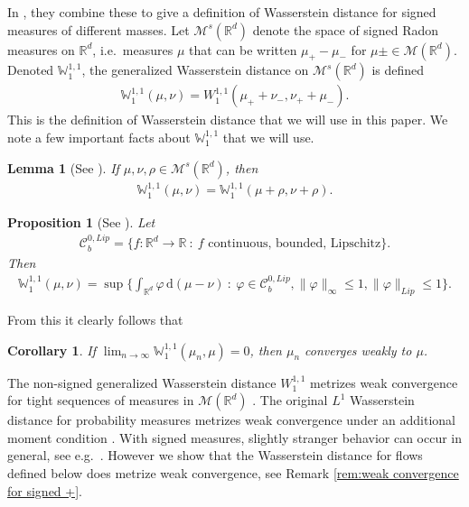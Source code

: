 \documentclass[11pt]{article}
\newtheorem{lemma}[thm]{Lemma}
\newtheorem{prop}[thm]{Proposition}
\newtheorem{cor}[thm]{Corollary}
\theoremstyle{remark}
\theoremstyle{definition}
\newcommand{\norm}[1] {\| #1\|}
\newcommand{\mc}[1]{\mathcal{#1}}
\newcommand{\m}[1]{\mathbb{#1}}
\newcommand{\dd}{\mathrm{d}}
\begin{document}
In \cite{piccoli_signed}, they combine these to give a definition of Wasserstein distance for signed measures of different masses. Let $\mc M^s(\m R^d)$ denote the space of signed Radon measures on $\m R^d$, i.e.\ measures $\mu$ that can be written $\mu_+-\mu_-$ for $\mu\pm\in \mc M(\m R^d)$. Denoted $\m W_1^{1,1}$, the generalized Wasserstein distance on $\mc M^s(\m R^d)$ is defined
\begin{align*}
    \m W_1^{1,1}(\mu,\nu) = W_1^{1,1}(\mu_+ + \nu_-,  \nu_+ + \mu_- ).
\end{align*}
This is the definition of Wasserstein distance that we will use in this paper. We note a few important facts about $\m W_1^{1,1}$ that we will use. 

\begin{lemma}[See {\cite[Lemma 18]{piccoli_signed}}]\label{lemma: wasserstein mass shift}
    If $\mu,\nu,\rho\in \mc M^s(\m R^d)$, then 
    \begin{align*}
        \m W_1^{1,1}(\mu,\nu) = \m W_1^{1,1}(\mu+\rho,\nu+\rho). 
    \end{align*}
\end{lemma}

\begin{prop}[See {\cite[Proposition 23]{piccoli_signed}}]\label{prop: dual definition wasserstein} 
Let 
    \begin{align*}
        \mc C_b^{0,Lip} = \{f : \m R^d\to \m R ~:~ f\text{ continuous, bounded, Lipschitz}\}.
    \end{align*} 
    Then
        \begin{align*}
            \m W_1^{1,1}(\mu,\nu) = \sup \bigg\{ \int_{\m R^d} \varphi\, \dd (\mu-\nu) ~:~ \varphi\in \mc C_b^{0,Lip}, \norm{\varphi}_{\infty} \leq 1, \norm{\varphi}_{Lip}\leq 1\bigg\}.
        \end{align*}
\end{prop}
From this it clearly follows that
\begin{cor}\label{cor: weak convergence wasserstein}
If $\lim_{n\to \infty} \m W_1^{1,1}(\mu_n,\mu) = 0$, then $\mu_n$ converges weakly to $\mu$. 
\end{cor}
The non-signed generalized Wasserstein distance $W^{1,1}_1$ metrizes weak convergence for tight sequences of measures in $\mc M(\m R^d)$ \cite[Theorem 13]{Piccoli2014-vy}. The original $L^1$ Wasserstein distance for probability measures metrizes weak convergence under an additional moment condition \cite[Theorem 6.9]{Villani2009}. With signed measures, slightly stranger behavior can occur in general, see e.g.\ \cite[Remark 26]{piccoli_signed}. However we show that the Wasserstein distance for flows defined below does metrize weak convergence, see Remark  \ref{rem:weak convergence for signed +}.
\end{document}
